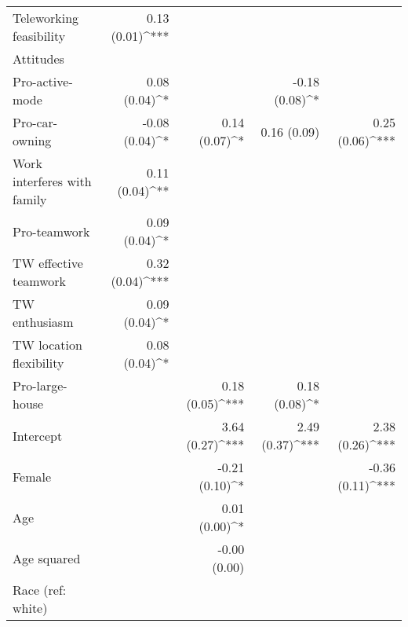 \documentclass[%
    twoside, openright, titlepage, numbers=noenddot,%
    cleardoublepage=empty,%
    abstract=false,%
    BCOR=5.5mm, paper=a5, fontsize=10pt,%
]{scrreprt}
\begin{document}
\begin{Schunk}
\begin{table}[t!]
\begin{center}
{\begin{tabular}{l D{)}{)}{9)3} D{)}{)}{9)3} D{)}{)}{9)3} D{)}{)}{9)3}}
Teleworking feasibility                    & 0.13 \; (0.01)^{***} &                      &                      &                       \\
Attitudes                                  &                      &                      &                      &                       \\
\quad Pro-active-mode                      & 0.08 \; (0.04)^{*}   &                      & -0.18 \; (0.08)^{*}  &                       \\
\quad Pro-car-owning                       & -0.08 \; (0.04)^{*}  & 0.14 \; (0.07)^{*}   & 0.16 \; (0.09)       & 0.25 \; (0.06)^{***}  \\
\quad Work interferes with family          & 0.11 \; (0.04)^{**}  &                      &                      &                       \\
\quad Pro-teamwork                         & 0.09 \; (0.04)^{*}   &                      &                      &                       \\
\quad TW effective teamwork                & 0.32 \; (0.04)^{***} &                      &                      &                       \\
\quad TW enthusiasm                        & 0.09 \; (0.04)^{*}   &                      &                      &                       \\
\quad TW location flexibility              & 0.08 \; (0.04)^{*}   &                      &                      &                       \\
\quad Pro-large-house                      &                      & 0.18 \; (0.05)^{***} & 0.18 \; (0.08)^{*}   &                       \\
Intercept                                  &                      & 3.64 \; (0.27)^{***} & 2.49 \; (0.37)^{***} & 2.38 \; (0.26)^{***}  \\
Female                                     &                      & -0.21 \; (0.10)^{*}  &                      & -0.36 \; (0.11)^{***} \\
Age                                        &                      & 0.01 \; (0.00)^{*}   &                      &                       \\
Age squared                                &                      & -0.00 \; (0.00)      &                      &                       \\
Race (ref: white)                          &                      &                      &                      &                       \\

\end{tabular}}
\end{center}
\end{table}
\end{Schunk}
\end{document}
